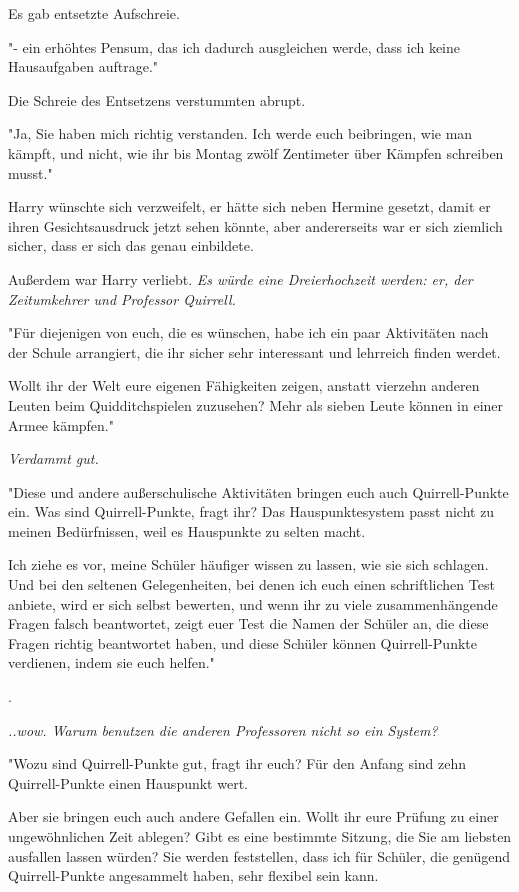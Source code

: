 {Es gab entsetzte Aufschreie.

"- ein erhöhtes Pensum, das ich dadurch ausgleichen werde, dass ich keine Hausaufgaben auftrage."

Die Schreie des Entsetzens verstummten abrupt.

"Ja, Sie haben mich richtig verstanden. Ich werde euch beibringen, wie man kämpft, und nicht, wie ihr bis Montag zwölf Zentimeter über Kämpfen schreiben musst."

Harry wünschte sich verzweifelt, er hätte sich neben Hermine gesetzt, damit er ihren Gesichtsausdruck jetzt sehen könnte, aber andererseits war er sich ziemlich sicher, dass er sich das genau einbildete.

Außerdem war Harry verliebt. \emph{Es würde eine Dreierhochzeit werden: er, der Zeitumkehrer und Professor Quirrell.}

"Für diejenigen von euch, die es wünschen, habe ich ein paar Aktivitäten nach der Schule arrangiert, die ihr sicher sehr interessant und lehrreich finden werdet.

Wollt ihr der Welt eure eigenen Fähigkeiten zeigen, anstatt vierzehn anderen Leuten beim Quidditchspielen zuzusehen? Mehr als sieben Leute können in einer Armee kämpfen."

\emph{\hfill\break Verdammt gut.}

"Diese und andere außerschulische Aktivitäten bringen euch auch Quirrell-Punkte ein. Was sind Quirrell-Punkte, fragt ihr? Das Hauspunktesystem passt nicht zu meinen Bedürfnissen, weil es Hauspunkte zu selten macht.

Ich ziehe es vor, meine Schüler häufiger wissen zu lassen, wie sie sich schlagen. Und bei den seltenen Gelegenheiten, bei denen ich euch einen schriftlichen Test anbiete, wird er sich selbst bewerten, und wenn ihr zu viele zusammenhängende Fragen falsch beantwortet, zeigt euer Test die Namen der Schüler an, die diese Fragen richtig beantwortet haben, und diese Schüler können Quirrell-Punkte verdienen, indem sie euch helfen."

.

\emph{..wow. Warum benutzen die anderen Professoren nicht so ein System?}

"Wozu sind Quirrell-Punkte gut, fragt ihr euch? Für den Anfang sind zehn Quirrell-Punkte einen Hauspunkt wert.

Aber sie bringen euch auch andere Gefallen ein. Wollt ihr eure Prüfung zu einer ungewöhnlichen Zeit ablegen? Gibt es eine bestimmte Sitzung, die Sie am liebsten ausfallen lassen würden? Sie werden feststellen, dass ich für Schüler, die genügend Quirrell-Punkte angesammelt haben, sehr flexibel sein kann.

}
